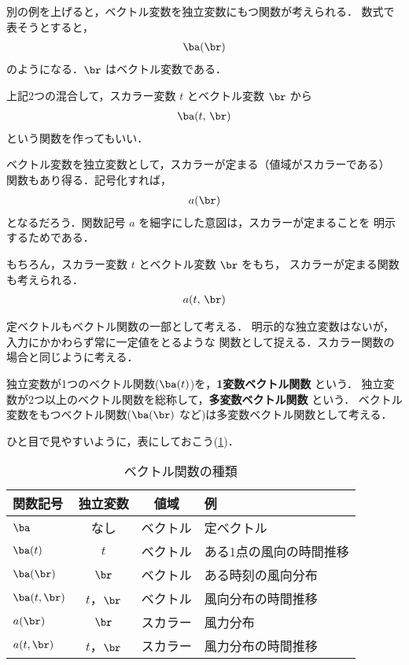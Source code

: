     別の例を上げると，ベクトル変数を独立変数にもつ関数が考えられる．
    数式で表そうとすると，
        \begin{align}
            \ba (\br)
        \end{align}
    のようになる．$\br$ はベクトル変数である．

    上記2つの混合して，スカラー変数 $t$ とベクトル変数 $\br$ から
        \begin{align}
            \ba (t,\,\br)
        \end{align}
    という関数を作ってもいい．

    ベクトル変数を独立変数として，スカラーが定まる（値域がスカラーである）
    関数もあり得る．記号化すれば，
        \begin{align}
            a (\br)
        \end{align}
    となるだろう．関数記号 $a$ を細字にした意図は，スカラーが定まることを
    明示するためである．

    もちろん，スカラー変数 $t$ とベクトル変数 $\br$ をもち，
    スカラーが定まる関数も考えられる．
        \begin{align}
            a (t,\,\br)
        \end{align}

    定ベクトルもベクトル関数の一部として考える．
    明示的な独立変数はないが，入力にかかわらず常に一定値をとるような
    関数として捉える．スカラー関数の場合と同じように考える．

    独立変数が1つのベクトル関数($\ba(t)$)を，\textbf{1変数ベクトル関数} という．
    独立変数が2つ以上のベクトル関数を総称して，\textbf{多変数ベクトル関数} という．
    ベクトル変数をもつベクトル関数($\ba(\br)$ など)は多変数ベクトル関数として考える．

    ひと目で見やすいように，表にしておこう(\Table\ref{table:f4unit})．
        \begin{table}[htb]
          \centering
          \caption{ベクトル関数の種類}
          \begin{tabular}{|l|c|c|l|}                                        \hline
            関数記号      & 独立変数   & 値域     & 例                      \\ \hline  \hline
            $\ba$         & なし       & ベクトル & 定ベクトル              \\ \hline
            $\ba(t)$      & $t$        & ベクトル & ある1点の風向の時間推移 \\ \hline
            $\ba(\br)$    & $\br$      & ベクトル & ある時刻の風向分布      \\ \hline
            $\ba(t, \br)$ & $t$，$\br$ & ベクトル & 風向分布の時間推移      \\ \hline
            $a(\br)$      & $\br$      & スカラー & 風力分布                \\ \hline
            $a(t, \br)$   & $t$，$\br$ & スカラー & 風力分布の時間推移      \\ \hline
          \end{tabular}
          \label{table:f4unit}
        \end{table}

